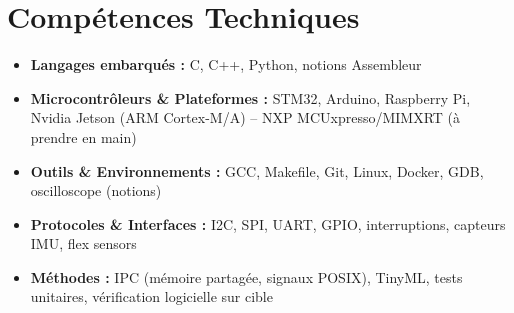 \documentclass[a4paper,11pt]{article}
\begin{document}
\section{Compétences Techniques}
\begin{itemize}[leftmargin=*, nosep]
    \item \small{\textbf{Langages embarqués :} C, C++, Python, notions Assembleur}
    \item \small{\textbf{Microcontrôleurs \& Plateformes :} STM32, Arduino, Raspberry Pi, Nvidia Jetson (ARM Cortex-M/A) -- NXP MCUxpresso/MIMXRT (à prendre en main)}
    \item \small{\textbf{Outils \& Environnements :} GCC, Makefile, Git, Linux, Docker, GDB, oscilloscope (notions)}
    \item \small{\textbf{Protocoles \& Interfaces :} I2C, SPI, UART, GPIO, interruptions, capteurs IMU, flex sensors}
    \item \small{\textbf{Méthodes :} IPC (mémoire partagée, signaux POSIX), TinyML, tests unitaires, vérification logicielle sur cible}
\end{itemize}

\end{document}
